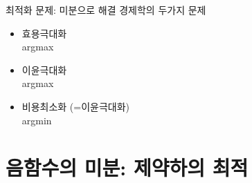 \documentclass[aspectratio=169]{beamer}
\begin{document}


\begin{frame}{최적화 문제: 미분으로 해결}
  경제학의 두가지 문제
  \begin{itemize}
    \item 효용극대화\\
          argmax
    \item 이윤극대화\\
          argmax
    \item 비용최소화 (=이윤극대화)\\
          argmin
  \end{itemize}
\end{frame}









\section{음함수의 미분: 제약하의 최적}
\end{document}
